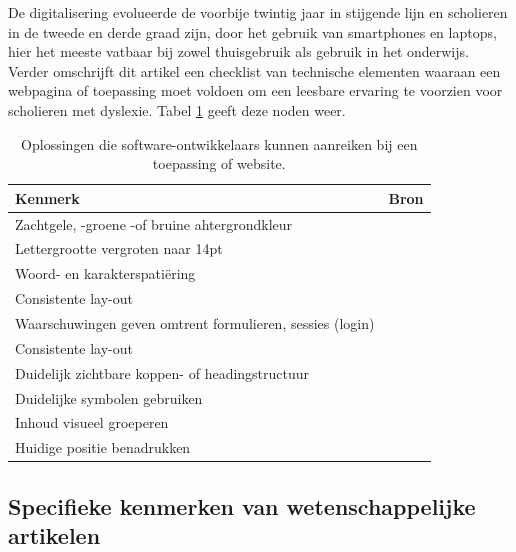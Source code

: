 \medspace

De digitalisering evolueerde de voorbije twintig jaar in stijgende lijn en scholieren in de tweede en derde graad zijn, door het gebruik van smartphones en laptops, hier het meeste vatbaar bij zowel thuisgebruik als gebruik in het onderwijs. Verder omschrijft dit artikel een checklist van technische elementen waaraan een webpagina of toepassing moet voldoen om een leesbare ervaring te voorzien voor scholieren met dyslexie. Tabel \ref{table:dyslexia-necessaries} geeft deze noden weer.

\begin{center}
		\begin{table}[H]
	\begin{tabular}{ | m{8cm} | m{7cm} | } 
		\hline
		Kenmerk & Bron \\
		\hline
		Zachtgele, -groene -of bruine ahtergrondkleur 	& \textcite{Santana2012} \\ \hline
		Lettergrootte vergroten naar 14pt 				& \autocite{Rello2015} \\ \hline
		Woord- en karakterspatiëring 					& \textcite{Santana2012, Rello2013b} \\ \hline
		Consistente lay-out 							& \autocite{Rello2015} \\  \hline
		Waarschuwingen geven omtrent formulieren, sessies (login) & \\ \hline
		Consistente lay-out 							& \autocite{Rello2015, Fernando2021} \\ \hline
		Duidelijk zichtbare koppen- of headingstructuur & \autocite{Rello2012a} \\ \hline
		Duidelijke symbolen gebruiken 					& \autocite{Rello2013b} \\ \hline
		Inhoud visueel groeperen 						& \autocite{Rello2015, Fernando2021}\\ \hline
		Huidige positie benadrukken 					& \autocite{Fernando2021} \\ \hline
		
	\end{tabular}
	\caption{Oplossingen die software-ontwikkelaars kunnen aanreiken bij een toepassing of website.}
	\label{table:dyslexia-necessaries}
	\end{table}
\end{center}

\subsection{Specifieke kenmerken van wetenschappelijke artikelen}

